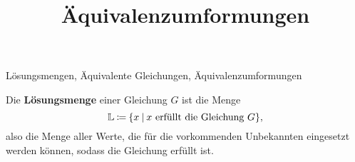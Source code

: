 \documentclass[]{uebungsblatt}
\title{Äquivalenzumformungen}
\begin{document}
\maketitle
\begin{contents}
    Lösungsmengen, Äquivalente Gleichungen, Äquivalenzumformungen
\end{contents}


\begin{definition}
    Die \textbf{Lösungsmenge} einer Gleichung $G$ ist die Menge 
    \[\mathbb{L}\mathbin{\coloneqq}\{x\:|\:x~\text{erfüllt die Gleichung~}G\},\]
    also die Menge aller Werte, die für die vorkommenden Unbekannten eingesetzt werden können, sodass die Gleichung erfüllt ist.
\end{definition}
%
\end{document}
